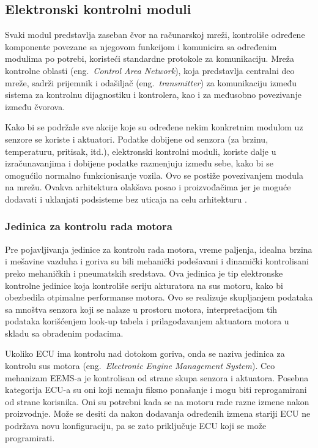 \documentclass[a4paper]{article}
\begin{document}
\subsection{Elektronski kontrolni moduli}
\label{subsec:moduli}

Svaki modul predstavlja zaseban čvor na računarskoj mreži, kontroliše određene komponente povezane sa njegovom funkcijom i komunicira sa određenim modulima po potrebi, koristeći standardne protokole za komunikaciju. Mreža kontrolne oblasti (eng.~{\em Control Area Network}), koja predstavlja centralni deo mreže, sadrži prijemnik i odašiljač (eng.~{\em transmitter}) za komunikaciju između sistema za kontrolnu dijagnostiku i kontrolera, kao i za međusobno povezivanje između čvorova.

Kako bi se podržale sve akcije koje su određene nekim konkretnim modulom uz senzore se koriste i aktuatori. Podatke dobijene od senzora (za brzinu, temperaturu, pritisak,  itd.), elektronski kontrolni moduli, koriste dalje u izračunavanjima i dobijene podatke razmenjuju između sebe, kako bi se omogućilo normalno funkcionisanje vozila. Ovo se postiže povezivanjem modula na mrežu. Ovakva arhitektura olakšava posao i proizvođačima jer je moguće dodavati i uklanjati podsisteme bez uticaja na celu arhitekturu \cite{HIW}.

\subsubsection{Jedinica za kontrolu rada motora}
\label{subsubsec:ECU}

Pre pojavljivanja jedinice za kontrolu rada motora, vreme paljenja, idealna brzina i mešavine vazduha i goriva su bili mehanički podešavani i dinamički kontrolisani preko mehaničkih i pneumatskih sredstava. Ova jedinica je tip elektronske kontrolne jedinice koja kontroliše seriju akturatora na sus motoru, kako bi obezbedila otpimalne performanse motora. Ovo se realizuje skupljanjem podataka sa mnoštva senzora koji se nalaze u prostoru motora, interpretacijom tih podataka korišćenjem look-up tabela i prilagođavanjem aktuatora motora u skladu sa obrađenim podacima.

Ukoliko ECU ima kontrolu nad dotokom goriva, onda se naziva jedinica za kontrolu sus motora (eng.~{\em Electronic Engine Management System}). Ceo mehanizam EEMS-a je kontrolisan od strane skupa senzora i aktuatora. 
Posebna kategorija ECU-a su oni koji nemaju fiksno ponašanje i mogu biti reprogamirani od strane korisnika. Oni su potrebni kada se na motoru rade razne izmene nakon proizvodnje. Može se desiti da nakon dodavanja određenih izmena stariji ECU ne podržava novu konfiguraciju, pa se zato priključuje ECU koji se može programirati.
\end{document}
